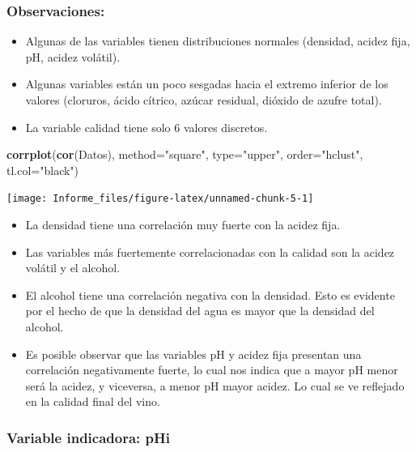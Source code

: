 \documentclass[
]{article}
\newenvironment{Shaded}{\begin{snugshade}}{\end{snugshade}}
\newcommand{\DataTypeTok}[1]{\textcolor[rgb]{0.13,0.29,0.53}{#1}}
\newcommand{\KeywordTok}[1]{\textcolor[rgb]{0.13,0.29,0.53}{\textbf{#1}}}
\newcommand{\NormalTok}[1]{#1}
\newcommand{\StringTok}[1]{\textcolor[rgb]{0.31,0.60,0.02}{#1}}
\begin{document}
\hypertarget{observaciones}{%
\subsubsection{Observaciones:}\label{observaciones}}

\begin{itemize}
\item
  Algunas de las variables tienen distribuciones normales (densidad,
  acidez fija, pH, acidez volátil).
\item
  Algunas variables están un poco sesgadas hacia el extremo inferior de
  los valores (cloruros, ácido cítrico, azúcar residual, dióxido de
  azufre total).
\item
  La variable calidad tiene solo 6 valores discretos.
\end{itemize}

\begin{Shaded}
\begin{Highlighting}[]
\KeywordTok{corrplot}\NormalTok{(}\KeywordTok{cor}\NormalTok{(Datos), }\DataTypeTok{method=}\StringTok{"square"}\NormalTok{, }\DataTypeTok{type=}\StringTok{"upper"}\NormalTok{, }\DataTypeTok{order=}\StringTok{"hclust"}\NormalTok{, }\DataTypeTok{tl.col=}\StringTok{"black"}\NormalTok{)}
\end{Highlighting}
\end{Shaded}

\begin{center}\texttt{[image: Informe\_files/figure-latex/unnamed-chunk-5-1]} \end{center}

\begin{itemize}
\item
  La densidad tiene una correlación muy fuerte con la acidez fija.
\item
  Las variables más fuertemente correlacionadas con la calidad son la
  acidez volátil y el alcohol.
\item
  El alcohol tiene una correlación negativa con la densidad. Esto es
  evidente por el hecho de que la densidad del agua es mayor que la
  densidad del alcohol.
\item
  Es posible observar que las variables pH y acidez fija presentan una
  correlación negativamente fuerte, lo cual nos indica que a mayor pH
  menor será la acidez, y viceversa, a menor pH mayor acidez. Lo cual se
  ve reflejado en la calidad final del vino.
\end{itemize}

\hypertarget{variable-indicadora-phi}{%
\subsubsection{Variable indicadora: pHi}\label{variable-indicadora-phi}}
\end{document}
